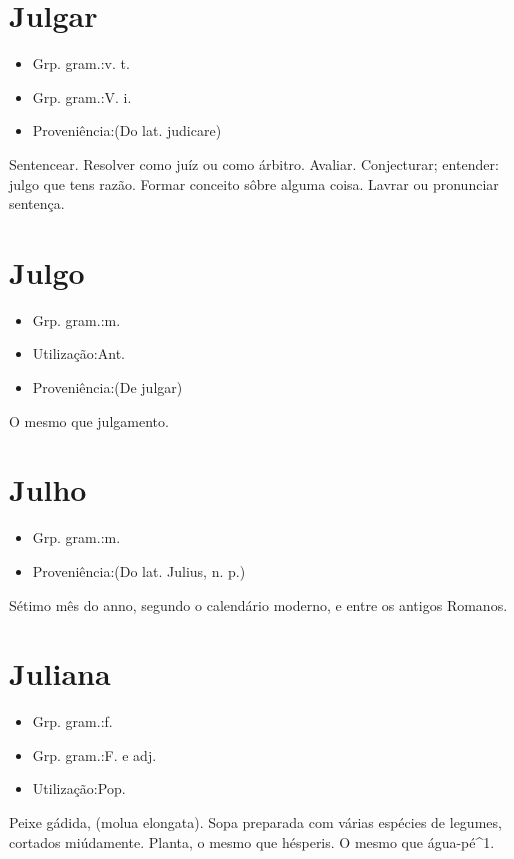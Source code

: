 \documentclass{article}
\begin{document}
\section{Julgar}
\begin{itemize}
\item {Grp. gram.:v. t.}
\end{itemize}
\begin{itemize}
\item {Grp. gram.:V. i.}
\end{itemize}
\begin{itemize}
\item {Proveniência:(Do lat. \textunderscore judicare\textunderscore )}
\end{itemize}
Sentencear.
Resolver como juíz ou como árbitro.
Avaliar.
Conjecturar; entender: \textunderscore julgo que tens razão\textunderscore .
Formar conceito sôbre alguma coisa.
Lavrar ou pronunciar sentença.
\section{Julgo}
\begin{itemize}
\item {Grp. gram.:m.}
\end{itemize}
\begin{itemize}
\item {Utilização:Ant.}
\end{itemize}
\begin{itemize}
\item {Proveniência:(De \textunderscore julgar\textunderscore )}
\end{itemize}
O mesmo que \textunderscore julgamento\textunderscore .
\section{Julho}
\begin{itemize}
\item {Grp. gram.:m.}
\end{itemize}
\begin{itemize}
\item {Proveniência:(Do lat. \textunderscore Julius\textunderscore , n. p.)}
\end{itemize}
Sétimo mês do anno, segundo o calendário moderno, e entre os antigos Romanos.
\section{Juliana}
\begin{itemize}
\item {Grp. gram.:f.}
\end{itemize}
\begin{itemize}
\item {Grp. gram.:F.  e  adj.}
\end{itemize}
\begin{itemize}
\item {Utilização:Pop.}
\end{itemize}
Peixe gádida, (\textunderscore molua elongata\textunderscore ).
Sopa preparada com várias espécies de legumes, cortados miúdamente.
Planta, o mesmo que \textunderscore hésperis\textunderscore .
O mesmo que \textunderscore água-pé\textunderscore ^1.
\end{document}
